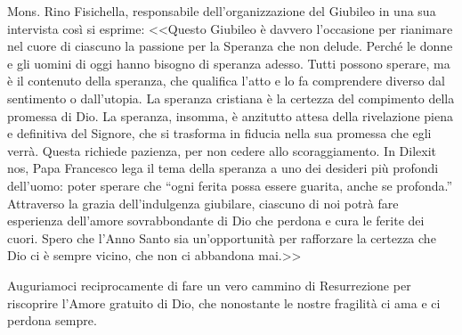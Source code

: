 Mons. Rino Fisichella, responsabile dell'organizzazione del Giubileo in una sua intervista così si esprime: <<Questo Giubileo è davvero l'occasione per rianimare nel cuore di ciascuno la passione per la Speranza che non delude. Perché le donne e gli uomini di oggi hanno bisogno di speranza adesso. Tutti possono sperare, ma è il contenuto della speranza, che qualifica l'atto e lo fa comprendere diverso dal sentimento o dall'utopia. La speranza cristiana è la certezza del compimento della promessa di Dio. La speranza, insomma, è anzitutto attesa della rivelazione piena e definitiva del Signore, che si trasforma in fiducia nella sua promessa che egli verrà. Questa richiede pazienza, per non cedere allo scoraggiamento. In Dilexit nos, Papa Francesco lega il tema della speranza a uno dei desideri più profondi dell'uomo: poter sperare che ``ogni ferita possa essere guarita, anche se profonda.'' Attraverso la grazia dell'indulgenza giubilare, ciascuno di noi potrà fare esperienza dell'amore sovrabbondante di Dio che perdona e cura le ferite dei cuori. Spero che l'Anno Santo sia un'opportunità per rafforzare la certezza che Dio ci è sempre vicino, che non ci abbandona mai.>>

Auguriamoci reciprocamente di fare un vero cammino di Resurrezione per riscoprire l'Amore gratuito di Dio, che nonostante le nostre fragilità ci ama e ci perdona sempre.


